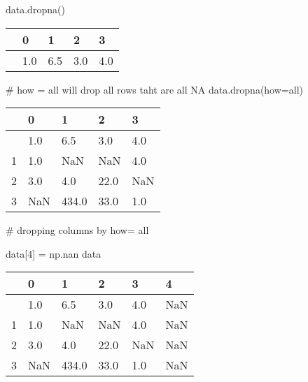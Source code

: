 \documentclass[
  letterpaper,
  DIV=11,
  numbers=noendperiod]{scrreprt}
\newenvironment{Shaded}{\begin{snugshade}}{\end{snugshade}}
\newcommand{\CommentTok}[1]{\textcolor[rgb]{0.37,0.37,0.37}{#1}}
\newcommand{\DecValTok}[1]{\textcolor[rgb]{0.68,0.00,0.00}{#1}}
\newcommand{\NormalTok}[1]{\textcolor[rgb]{0.00,0.23,0.31}{#1}}
\newcommand{\OperatorTok}[1]{\textcolor[rgb]{0.37,0.37,0.37}{#1}}
\newcommand{\StringTok}[1]{\textcolor[rgb]{0.13,0.47,0.30}{#1}}
\begin{document}
\begin{Shaded}
\begin{Highlighting}[]
\NormalTok{data.dropna()}
\end{Highlighting}
\end{Shaded}

\begin{longtable}[]{@{}lllll@{}}
\toprule\noalign{}
& 0 & 1 & 2 & 3 \\
\midrule\noalign{}
\endhead
\bottomrule\noalign{}
\endlastfoot
0 & 1.0 & 6.5 & 3.0 & 4.0 \\
\end{longtable}

\begin{Shaded}
\begin{Highlighting}[]
\CommentTok{\# how = \textquotesingle{}all\textquotesingle{} will drop all rows taht are all NA}
\NormalTok{data.dropna(how}\OperatorTok{=}\StringTok{\textquotesingle{}all\textquotesingle{}}\NormalTok{)}
\end{Highlighting}
\end{Shaded}

\begin{longtable}[]{@{}lllll@{}}
\toprule\noalign{}
& 0 & 1 & 2 & 3 \\
\midrule\noalign{}
\endhead
\bottomrule\noalign{}
\endlastfoot
0 & 1.0 & 6.5 & 3.0 & 4.0 \\
1 & 1.0 & NaN & NaN & 4.0 \\
2 & 3.0 & 4.0 & 22.0 & NaN \\
3 & NaN & 434.0 & 33.0 & 1.0 \\
\end{longtable}

\begin{Shaded}
\begin{Highlighting}[]
\CommentTok{\# dropping columns by how= all}

\NormalTok{data[}\DecValTok{4}\NormalTok{] }\OperatorTok{=}\NormalTok{ np.nan}
\NormalTok{data}
 
\end{Highlighting}
\end{Shaded}

\begin{longtable}[]{@{}llllll@{}}
\toprule\noalign{}
& 0 & 1 & 2 & 3 & 4 \\
\midrule\noalign{}
\endhead
\bottomrule\noalign{}
\endlastfoot
0 & 1.0 & 6.5 & 3.0 & 4.0 & NaN \\
1 & 1.0 & NaN & NaN & 4.0 & NaN \\
2 & 3.0 & 4.0 & 22.0 & NaN & NaN \\
3 & NaN & 434.0 & 33.0 & 1.0 & NaN \\
\end{longtable}
\end{document}
